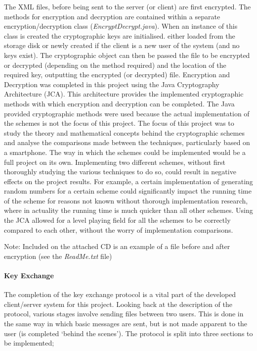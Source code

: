 \documentclass[a4paper,12pt]{report}
\begin{document}
The XML files, before being sent to the server (or client) are first encrypted. The methods for encryption and decryption are contained within a separate encryption/decryption class (\textit{EncryptDecrypt.java}). When an instance of this class is created the cryptographic keys are initialised. either loaded from the storage disk or newly created if the client is a new user of the system (and no keys exist). The cryptographic object can then be passed the file to be encrypted or decrypted (depending on the method required) and the location of the required key, outputting the encrypted (or decrypted) file. Encryption and Decryption was completed in this project using the Java Cryptography Architecture (JCA). This architecture provides the implemented cryptographic methods with which encryption and decryption can be completed. The Java provided cryptographic methods were used because the actual implementation of the schemes is not the focus of this project. The focus of this project was to study the theory and mathematical concepts behind the cryptographic schemes and analyse the comparisons made between the techniques, particularly based on a smartphone. The way in which the schemes could be implemented would be a full project on its own. Implementing two different schemes, without first thoroughly studying the various techniques to do so, could result in negative effects on the project results. For example, a certain implementation of generating random numbers for a certain scheme could significantly impact the running time of the scheme for reasons not known without thorough implementation research, where in actuality the running time is much quicker than all other schemes. Using the JCA allowed for a level playing field for all the schemes to be correctly compared to each other, without the worry of implementation comparisons. 

Note: Included on the attached CD is an example of a file before and after encryption (see the \textit{ReadMe.txt} file)

\paragraph{Key Exchange}

The completion of the key exchange protocol is a vital part of the developed client/server system for this project. Looking back at the description of the protocol, various stages involve sending files between two users. This is done in the same way in which basic messages are sent, but is not made apparent to the user (is completed ‘behind the scenes’). The protocol is split into three sections to be implemented;
\end{document}
